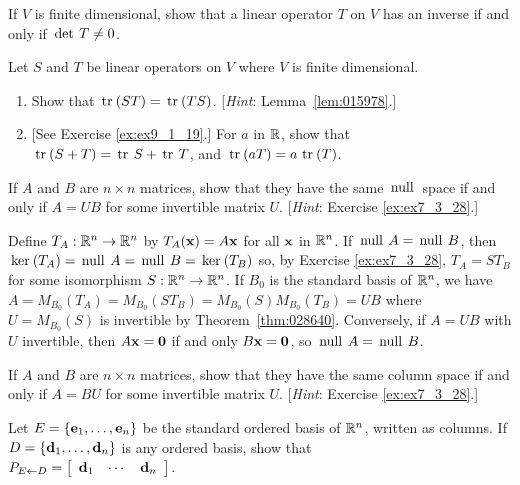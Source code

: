 \begin{multicols}{2}
\begin{ex}
If $V$ is finite dimensional, show that a linear operator $T$ on $V$ has an inverse if and only if $\thinspace\operatorname{det \medspace}T \neq 0$.
\end{ex}

\begin{ex}
Let $S$ and $T$ be linear operators on $V$ where $V$ is finite dimensional.


\begin{enumerate}[label={\alph*.}]
\item Show that $\thinspace\operatorname{tr\medspace}(ST) = \thinspace\operatorname{tr\medspace}(TS)$. [\textit{Hint}: Lemma~\ref{lem:015978}.]

\item {[See Exercise \ref{ex:ex9_1_19}.]} For $a$ in $\mathbb{R}$, show that $\thinspace\operatorname{tr\medspace}(S + T) = \thinspace\operatorname{tr \medspace}S + \thinspace\operatorname{tr \medspace}T$, and $\thinspace\operatorname{tr\medspace}(aT) = a \thinspace\operatorname{tr\medspace}(T)$.

\end{enumerate}
\end{ex}

\begin{ex}
If $A$ and $B$ are $n \times n$ matrices, show that they have the same $\thinspace\operatorname{null\medspace}$ space if and only if $A = UB$ for some invertible matrix $U$. [\textit{Hint}: Exercise \ref{ex:ex7_3_28}.]

\begin{sol}
Define $T_{A} : \mathbb{R}^n \to \mathbb{R}^n$ by $T_{A}(\textbf{x}) = A\textbf{x}$ for all $\textbf{x}$ in $\mathbb{R}^n$. If $\thinspace\operatorname{null \medspace}A = \thinspace\operatorname{null \medspace}B$, then $\thinspace\operatorname{ker\medspace}(T_{A}) = \thinspace\operatorname{null \medspace}A = \thinspace\operatorname{null \medspace}B = \thinspace\operatorname{ker\medspace}(T_{B})$ so, by Exercise \ref{ex:ex7_3_28}, $T_{A} = ST_{B}$ for some isomorphism $S : \mathbb{R}^n \to \mathbb{R}^n$. If $B_{0}$ is the standard basis of $\mathbb{R}^n$, we have $A = M_{B_0}(T_{A}) = M_{B_0}(ST_{B}) = M_{B_0}(S)M_{B_0}(T_{B}) = UB$ where $U = M_{B_0}(S)$ is invertible by Theorem~\ref{thm:028640}. Conversely, if $A = UB$ with $U$ invertible, then $A\textbf{x} = \textbf{0}$ if and only $B\textbf{x} = \textbf{0}$, so $\thinspace\operatorname{null \medspace}A = \thinspace\operatorname{null \medspace}B$.
\end{sol}
\end{ex}

\begin{ex}
If $A$ and $B$ are $n \times n$ matrices, show that they have the same column space if and only if $A = BU$ for some invertible matrix $U$. [\textit{Hint}: Exercise \ref{ex:ex7_3_28}.]
\end{ex}

\begin{ex}
Let $E = \{\textbf{e}_{1}, \dots, \textbf{e}_{n}\}$ be the standard ordered basis of $\mathbb{R}^n$, written as columns. If \\ $D = \{\textbf{d}_{1}, \dots, \textbf{d}_{n}\}$ is any ordered basis, show that \\ $P_{E \gets D} = \left[ \begin{array}{ccc} \textbf{d}_{1} & \cdots & \textbf{d}_{n} \end{array} \right]$.
\end{ex}


\end{multicols}
